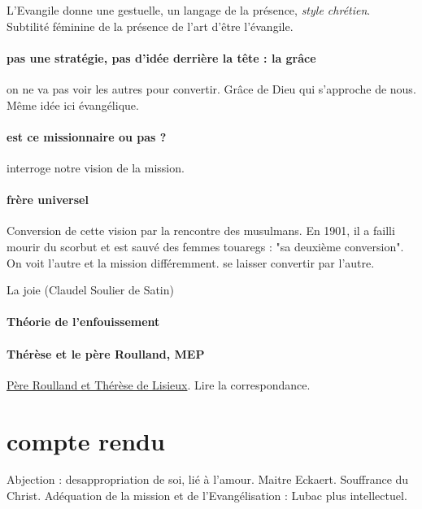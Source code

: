 L'Evangile donne une gestuelle, un langage de la présence, \textit{style chrétien}. Subtilité féminine de la présence de l'art d'être l'évangile. 

\paragraph{pas une stratégie, pas d'idée derrière la tête : la grâce} on ne va pas voir les autres pour convertir. Grâce de Dieu qui s'approche de nous. Même idée ici évangélique. 

\paragraph{est ce missionnaire ou pas ?} interroge notre vision de la mission. 

\paragraph{frère universel} Conversion de cette vision par la rencontre des musulmans. En 1901, il a failli mourir du scorbut et est sauvé des femmes touaregs : "sa deuxième conversion". On voit l'autre  et la mission différemment. se laisser convertir par l'autre.


\begin{singlequote}
    La joie (Claudel Soulier de Satin)
\end{singlequote}


\paragraph{Théorie de l'enfouissement}

\paragraph{Thérèse et le père Roulland, MEP} \href{https://missionsetrangeres.com/lunion-apostolique-de-sainte-therese-et-du-pere-adolphe-roulland-missionnaire-en-chine/}{Père Roulland et Thérèse de Lisieux}. Lire la correspondance.


\section{compte rendu}
\begin{Synthesis}
    Abjection : desappropriation de soi, lié à l'amour. Maitre Eckaert.
    Souffrance du Christ. 
    Adéquation de la mission et de l'Evangélisation : Lubac plus intellectuel. 
\end{Synthesis}

